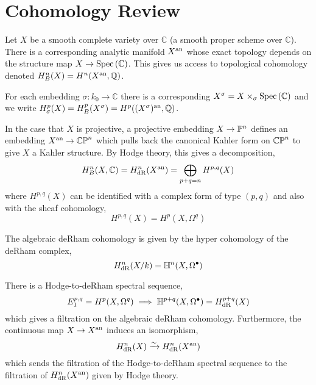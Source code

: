 \documentclass[12pt]{article}
\begin{document}
\section{Cohomology Review}

\renewcommand{\C}{\mathbb{C}}
\newcommand{\Hyper}{\mathbb{H}}
\newcommand{\R}{\mathbb{R}}


\begin{definition}
Let $X$ be a smooth complete variety over $\C$ (a smooth proper scheme over $\C$). There is a corresponding analytic manifold $X^{\an}$ whose exact topology depends on the structure map $X \to \Spec{\C}$. This gives us access to topological cohomology denoted $H_B^n(X) = H^{n}(X^\an, \Q)$. 
\end{definition}

\begin{definition}
For each embedding $\sigma : k_0 \to \C$ there is a corresponding $X^\sigma = X \times_\sigma \Spec{\C}$ and we write $H^p_\sigma(X) = H^p_B(X^\sigma) = H^p((X^\sigma)^\an, \Q)$. 
\end{definition}

\begin{remark}
In the case that $X$ is projective, a projective embedding $X \to \P^n$ defines an embedding $X^\an \to \CP^n$ which pulls back the canonical Kahler form on $\CP^n$ to give $X$ a Kahler structure. By Hodge theory, this gives a decomposition,
\[ H_B^n(X, \C) = H_{\dR}^n(X^\an) = \bigoplus_{p + q = n} H^{p,q}(X) \]
where $H^{p,q}(X)$ can be identified with a complex form of type $(p,q)$ and also with the sheaf cohomology,
\[ H^{p,q}(X) = H^p(X, \Omega^q) \]
\end{remark}

\begin{definition}
The algebraic deRham cohomology is given by the hyper cohomology of the deRham complex,
\[ H^n_\dR(X / k) = \Hyper^n(X, \Omega^\bullet) \]
\end{definition}

\begin{theorem}
There is a Hodge-to-deRham spectral sequence,
\[ E^{p,q}_1 = H^p(X, \Omega^q) \implies \Hyper^{p+q}(X, \Omega^\bullet) = H^{p + q}_{\dR}(X) \]
which gives a filtration on the algebraic deRham cohomology. Furthermore, the continuous map $X \to X^\an$ induces an isomorphism,
\[ H^n_\dR(X) \xrightarrow{\sim} H^n_{\dR}(X^\an) \]
which sends the filtration of the Hodge-to-deRham spectral sequence to the filtration of $H^n_{\dR}(X^\an)$ given by Hodge theory. 
\end{theorem}
\end{document}
